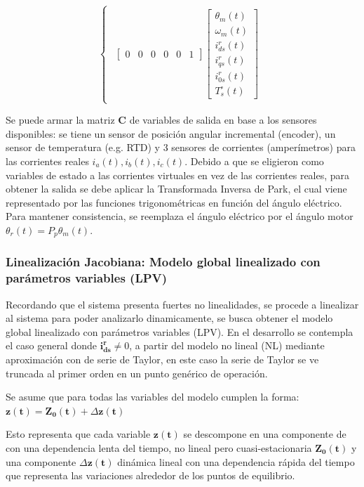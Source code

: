 \documentclass[blue,fullpaper]{ludusofficial}  %
\begin{document}
\begin{equation}
\begin{cases}
\begin{aligned}
\begin{bmatrix}
0 & 0 & 0 & 0 & 0 & 1
\end{bmatrix} \begin{bmatrix} \theta_{m}(t) \\ \omega_{m}(t) \\ i_{ds}^{r}(t) \\ i_{qs}^{r}(t) \\ i_{0s}^{r}(t) \\ T_{s}^{\circ}(t) \end{bmatrix}
\end{aligned}
\end{cases}
\end{equation}

Se puede armar la matriz $\mathbf{C}$ de variables de salida en base a los sensores disponibles: se tiene un sensor de posición angular incremental (encoder), un sensor de temperatura (e.g. RTD) y 3 sensores de corrientes (amperímetros) para las corrientes reales $i_{a}(t), i_{b}(t), i_{c}(t)$. Debido a que se eligieron como variables de estado a las corrientes virtuales en vez de las corrientes reales, para obtener la salida se debe aplicar la Transformada Inversa de Park, el cual viene representado por las funciones trigonométricas en función del ángulo eléctrico. Para mantener consistencia, se reemplaza el ángulo eléctrico por el ángulo motor $\theta_{r}(t) = P_{p} \theta_{m}(t)$.

\subsubsection{Linealización Jacobiana: Modelo global linealizado con parámetros variables (LPV)}
Recordando que el sistema presenta fuertes no linealidades, se procede a linealizar al sistema para poder analizarlo dinamicamente, se busca obtener el modelo global linealizado con parámetros variables (LPV). En el desarrollo se contempla el caso general donde $\mathbf{i_{ds}^{r}}\neq0$, a partir del modelo no lineal (NL) mediante aproximación con de serie de Taylor, en este caso la serie de Taylor se ve truncada al primer orden en un punto genérico de operación.  

Se asume que para todas las variables del modelo cumplen la forma: 
$\mathbf{z(t)}=\mathbf{Z_0(t)}+\Delta\mathbf{z(t)}$ 

Esto representa que cada variable $\mathbf{z(t)}$ se descompone en una componente de con una dependencia lenta del tiempo, no lineal pero cuasi-estacionaria  $\mathbf{Z_0(t)}$ y una componente $\Delta\mathbf{z(t)}$ dinámica lineal con una dependencia rápida del tiempo que representa las variaciones alrededor de los puntos de equilibrio.
\end{document}
